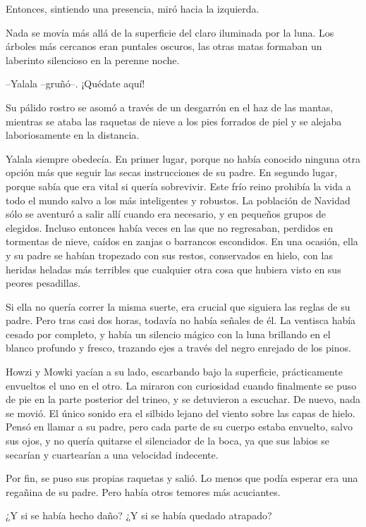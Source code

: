 Entonces, sintiendo una presencia, miró hacia la izquierda.
 
Nada se movía más allá de la superficie del claro iluminada por la luna. Los árboles más cercanos eran puntales oscuros, las otras matas formaban un laberinto silencioso en la perenne noche.
 
--Yalala --gruñó--. ¡Quédate aquí!
 
Su pálido rostro se asomó a través de un desgarrón en el haz de las mantas, mientras se ataba las raquetas de nieve a los pies forrados de piel y se alejaba laboriosamente en la distancia.
 
Yalala siempre obedecía. En primer lugar, porque no había conocido ninguna otra opción más que seguir las secas instrucciones de su padre. En segundo lugar, porque sabía que era vital si quería sobrevivir. Este frío reino prohibía la vida a todo el mundo salvo a los más inteligentes y robustos. La población de Navidad sólo se aventuró a salir allí cuando era necesario, y en pequeños grupos de elegidos. Incluso entonces había veces en las que no regresaban, perdidos en tormentas de nieve, caídos en zanjas o barrancos escondidos. En una ocasión, ella y su padre se habían tropezado con sus restos, conservados en hielo, con las heridas heladas más terribles que cualquier otra cosa que hubiera visto en sus peores pesadillas.
 
Si ella no quería correr la misma suerte, era crucial que siguiera las reglas de su padre. Pero tras casi dos horas, todavía no había señales de él. La ventisca había cesado por completo, y había un silencio mágico con la luna brillando en el blanco profundo y fresco, trazando ejes a través del negro enrejado de los pinos.
 
Howzi y Mowki yacían a su lado, escarbando bajo la superficie, prácticamente envueltos el uno en el otro. La miraron con curiosidad cuando finalmente se puso de pie en la parte posterior del trineo, y se detuvieron a escuchar. De nuevo, nada se movió. El único sonido era el silbido lejano del viento sobre las capas de hielo. Pensó en llamar a su padre, pero cada parte de su cuerpo estaba envuelto, salvo sus ojos, y no quería quitarse el silenciador de la boca, ya que sus labios se secarían y cuartearían a una velocidad indecente.
 
Por fin, se puso sus propias raquetas y salió. Lo menos que podía esperar era una regañina de su padre. Pero había otros temores más acuciantes.
 
¿Y si se había hecho daño? ¿Y si se había quedado atrapado?
 
